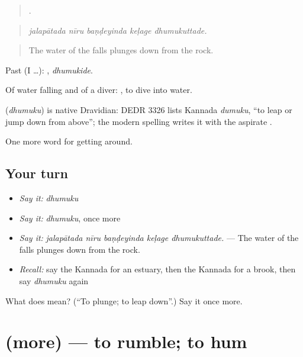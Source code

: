 \begin{quote}
    .
\end{quote}

\begin{quote}
\emph{jalapātada nīru baṇḍeyinda keḷage dhumukuttade.}
\end{quote}

\begin{quote}
The water of the falls plunges down from the rock.
\end{quote}

Past (I …): , \emph{dhumukide}.

Of water falling and of a diver:  , to dive into water.

\begin{cousinweb}
\textbf{} (\emph{dhumuku}) is native Dravidian: DEDR 3326 lists Kannada \emph{dumuku}, \textquotedblleft{}to leap or jump down from above\textquotedblright{}; the modern spelling writes it with the aspirate .
\end{cousinweb}

\begin{grammarlens}[title={What you've built}]
One more word for getting around.
\end{grammarlens}

\subsection*{Your turn}
\begin{itemize}
\raggedright
  \item \emph{Say it:} \emph{dhumuku}
  \item \emph{Say it:} \emph{dhumuku}, once more
  \item \emph{Say it:} \emph{jalapātada nīru baṇḍeyinda keḷage dhumukuttade.} — The water of the falls plunges down from the rock.
  \item \emph{Recall:} say the Kannada for an estuary, then the Kannada for a brook, then say \emph{dhumuku} again
\end{itemize}

\begin{tcolorbox}[breakable,colback=teal!4,colframe=teal!35!black,title={Before you move on}]
What does  mean? (\textquotedblleft{}To plunge; to leap down\textquotedblright{}.) Say it once more.
\end{tcolorbox}
\section[\texorpdfstring{\kn{ಮೊರೆ} (more)}{ಮೊರೆ (more)}]{ (more) — to rumble; to hum}

